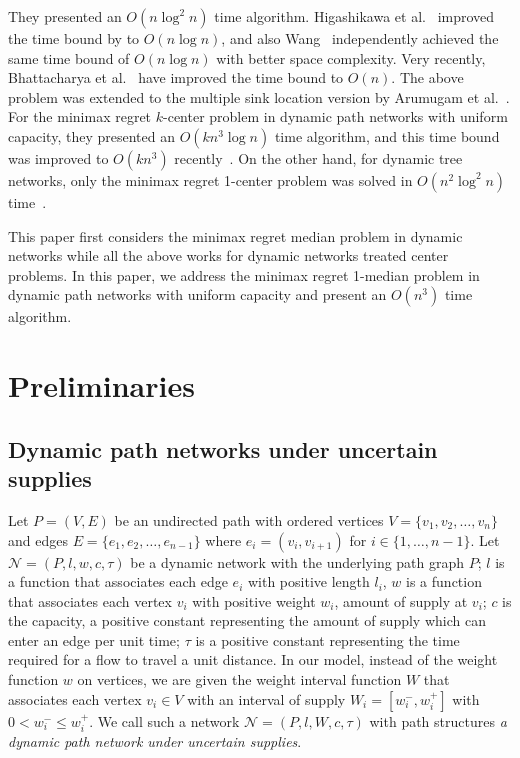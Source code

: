 \documentclass[a4paper]{llncs}
\begin{document}
They presented an $O(n \log^2 n)$ time algorithm.
Higashikawa et al.~\cite{hacknsx14} improved the time bound by \cite{chknsx13} to $O(n \log n)$, and also Wang~\cite{w13} independently achieved the same time bound of $O(n \log n)$ with better space complexity.
Very recently, Bhattacharya et al.~\cite{bk14} have improved the time bound to $O(n)$.
The above problem was extended to the multiple sink location version by Arumugam et al.~\cite{aags14}.
For the minimax regret $k$-center problem in dynamic path networks with uniform capacity, they presented an $O(kn^3 \log n)$ time algorithm, and this time bound was improved to $O(kn^3)$ recently~\cite{h14}.
On the other hand, for dynamic tree networks, only the minimax regret 1-center problem was solved in $O(n^2 \log^2 n)$ time~\cite{hgk14,hgk14_3}.

This paper first considers the minimax regret median problem in dynamic networks while all the above works for dynamic networks treated center problems.
In this paper, we address the minimax regret 1-median problem in dynamic path networks with uniform capacity and present an $O(n^3)$ time algorithm. \\





















\section{Preliminaries}
\label{sec:pre}

\subsection{Dynamic path networks under uncertain supplies}
\label{subsec:dpn}
Let $P =(V, E)$ be an undirected path with ordered vertices  $V = \{ v_1, v_2, \ldots, v_n \}$ and  edges $E = \{ e_1, e_2, \ldots, e_{n-1} \}$ where
 $e_i=(v_i,v_{i+1})$ for $i \in \{1, \ldots, n-1\}$.
Let $\mathcal{N} = (P, l, w, c, \tau)$ be a dynamic network 
with the underlying path graph $P$; 
$l$ is a function that associates each edge $e_i$ with positive length $l_i$, 
$w$ is a function that associates each vertex $v_i$ with positive weight $w_i$, amount of supply at $v_i$;
$c$ is the capacity, a positive constant representing the amount of supply which can enter an edge per unit time;
$\tau$ is a positive constant representing the time required for a flow to travel a unit distance.
In our model, instead of the weight function $w$ on vertices, we are given the weight interval function $W$
that associates each vertex $v_i \in V$ with an interval of supply $W_i = [w^-_i, w^+_i]$ with $0 < w^-_i \leq w^+_i$.
We call such a network $\mathcal{N} = (P, l, W, c, \tau)$ with path structures {\it a dynamic path network under uncertain supplies}.
\end{document}
